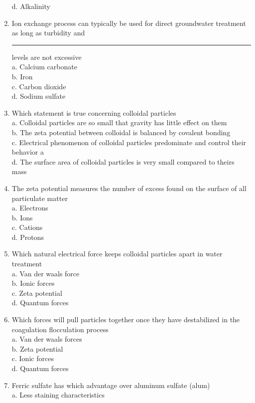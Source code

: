 \begin{enumerate}
d.  Alkalinity\\
\item Ion exchange process can typically be used for direct groundwater treatment as long as turbidity and \rule{1.5cm}{0.5pt} levels are not excessive\\
a.  Calcium carbonate\\
b.  Iron\\
c.  Carbon dioxide\\
d.  Sodium sulfate\\
\item Which statement is true concerning colloidal particles\\
a.  Colloidal particles are so small that gravity has little effect on them\\
b.  The zeta potential between colloidal is balanced by covalent bonding\\
c.  Electrical phenomenon of colloidal particles predominate and control their behavior a\\
d.  The surface area of colloidal particles is very small compared to theirs mass\\
\item The zeta potential measures the number of excess found on the surface of all particulate matter\\
a.  Electrons\\
b.  Ions\\
c.  Cations\\
d.  Protons\\
\item Which natural electrical force keeps colloidal particles apart in water treatment\\
a.  Van der waals force\\
b.  Ionic forces\\
c.  Zeta potential\\
d.  Quantum forces\\
\item Which forces will pull particles together once they have destabilized in the coagulation flocculation process\\
a.  Van der waals forces\\
b.  Zeta potential\\
c.  Ionic forces\\
d.  Quantum forces\\
\item Ferric sulfate has which advantage over aluminum sulfate (alum)\\
a.  Less staining characteristics\\

\end{enumerate}
